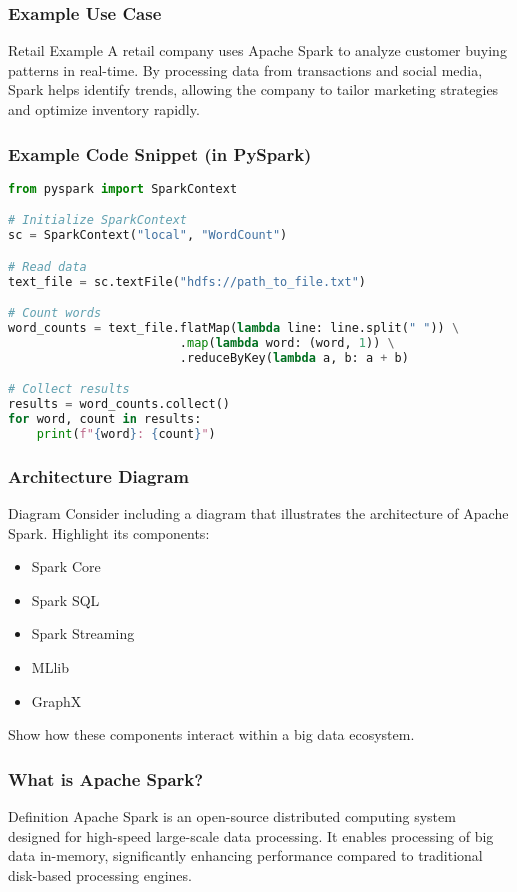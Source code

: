 \documentclass[aspectratio=169]{beamer}
\begin{document}
\begin{frame}[fragile]
    \frametitle{Example Use Case}
    \begin{block}{Retail Example}
        A retail company uses Apache Spark to analyze customer buying patterns in real-time. By processing data from transactions and social media, Spark helps identify trends, allowing the company to tailor marketing strategies and optimize inventory rapidly.
    \end{block}
\end{frame}

\begin{frame}[fragile]
    \frametitle{Example Code Snippet (in PySpark)}
    \begin{lstlisting}[language=Python]
from pyspark import SparkContext

# Initialize SparkContext
sc = SparkContext("local", "WordCount")

# Read data
text_file = sc.textFile("hdfs://path_to_file.txt")

# Count words
word_counts = text_file.flatMap(lambda line: line.split(" ")) \
                        .map(lambda word: (word, 1)) \
                        .reduceByKey(lambda a, b: a + b)

# Collect results
results = word_counts.collect()
for word, count in results:
    print(f"{word}: {count}")
    \end{lstlisting}
\end{frame}

\begin{frame}[fragile]
    \frametitle{Architecture Diagram}
    \begin{block}{Diagram}
        Consider including a diagram that illustrates the architecture of Apache Spark. Highlight its components:
        \begin{itemize}
            \item Spark Core
            \item Spark SQL
            \item Spark Streaming
            \item MLlib
            \item GraphX
        \end{itemize}
        Show how these components interact within a big data ecosystem.
    \end{block}
\end{frame}

\begin{frame}[fragile]
    \frametitle{What is Apache Spark?}
    \begin{block}{Definition}
        Apache Spark is an open-source distributed computing system designed for high-speed large-scale data processing.
        It enables processing of big data in-memory, significantly enhancing performance compared to traditional disk-based processing engines.
    \end{block}
\end{frame}
\end{document}
